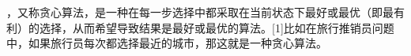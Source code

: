     
，又称贪心算法，是一种在每一步选择中都采取在当前状态下最好或最优（即最有利）的选择，从而希望导致结果是最好或最优的算法。[1]比如在旅行推销员问题中，如果旅行员每次都选择最近的城市，那这就是一种贪心算法。\\
